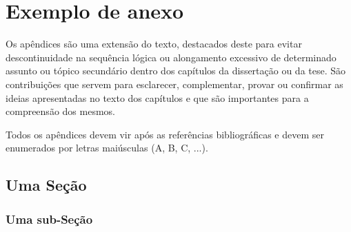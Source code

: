 \chapter{Exemplo de anexo}


Os apêndices são uma extensão do texto, destacados deste para evitar descontinuidade na sequência lógica ou alongamento excessivo de determinado assunto ou tópico secundário dentro dos capítulos da dissertação ou da tese. São contribuições que servem para esclarecer, complementar, provar ou confirmar as ideias apresentadas no texto dos capítulos e que são importantes para a compreensão dos mesmos.

Todos os apêndices devem vir após as referências bibliográficas e devem ser enumerados por letras maiúsculas (A, B, C, ...).


\section{Uma Seção}

\lipsum[20-23]


\subsection{Uma sub-Seção}

\lipsum[30-33]

